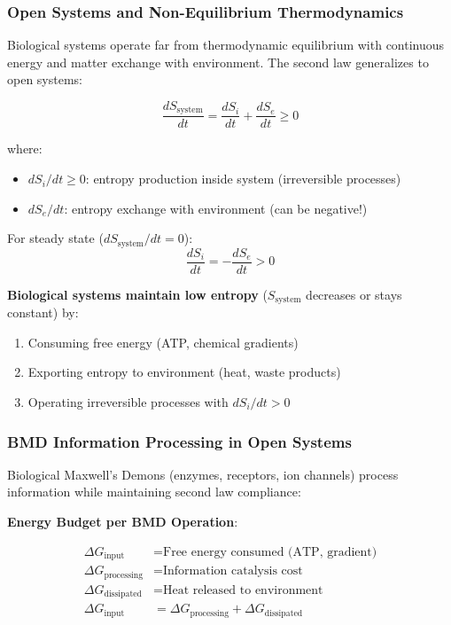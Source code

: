 \documentclass[11pt,a4paper]{article}
\begin{document}
\subsubsection{Open Systems and Non-Equilibrium Thermodynamics}

Biological systems operate far from thermodynamic equilibrium with continuous energy and matter exchange with environment\cite{schrodinger1944life,prigogine1978time}. The second law generalizes to open systems:

\begin{equation}
\frac{dS_{\text{system}}}{dt} = \frac{dS_i}{dt} + \frac{dS_e}{dt} \geq 0
\end{equation}

where:
\begin{itemize}
\item $dS_i/dt \geq 0$: entropy production inside system (irreversible processes)
\item $dS_e/dt$: entropy exchange with environment (can be negative!)
\end{itemize}

For steady state ($dS_{\text{system}}/dt = 0$):
\begin{equation}
\frac{dS_i}{dt} = -\frac{dS_e}{dt} > 0
\end{equation}

\textbf{Biological systems maintain low entropy} ($S_{\text{system}}$ decreases or stays constant) by:
\begin{enumerate}
\item Consuming free energy (ATP, chemical gradients)
\item Exporting entropy to environment (heat, waste products)
\item Operating irreversible processes with $dS_i/dt > 0$
\end{enumerate}

\subsubsection{BMD Information Processing in Open Systems}

Biological Maxwell's Demons (enzymes, receptors, ion channels) process information while maintaining second law compliance:

\textbf{Energy Budget per BMD Operation}:

\begin{align}
\Delta G_{\text{input}} &= \text{Free energy consumed (ATP, gradient)} \\
\Delta G_{\text{processing}} &= \text{Information catalysis cost} \\
\Delta G_{\text{dissipated}} &= \text{Heat released to environment} \\
\Delta G_{\text{input}} &= \Delta G_{\text{processing}} + \Delta G_{\text{dissipated}}
\end{align}
\end{document}
